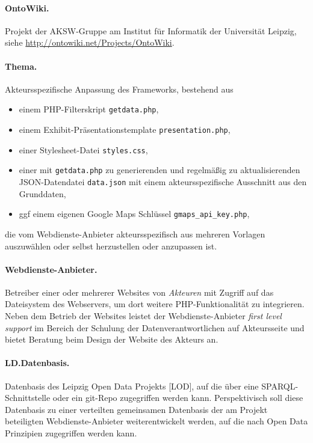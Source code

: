 \documentclass[11pt,a4paper]{article}
\begin{document}
\paragraph{OntoWiki.} 
Projekt der AKSW-Gruppe am Institut für Informatik der Universität Leipzig,
siehe \url{http://ontowiki.net/Projects/OntoWiki}.

\paragraph{Thema.} 
Akteursspezifische Anpassung des Frameworks, bestehend aus 
\begin{itemize}
\item einem PHP-Filterskript \texttt{getdata.php},
\item einem Exhibit-Präsentationstemplate \texttt{presentation.php},
\item einer Stylesheet-Datei \texttt{styles.css},
\item einer mit \texttt{getdata.php} zu generierenden und regelmäßig zu
  aktualisierenden JSON-Datendatei \texttt{data.json} mit einem
  akteursspezifische Ausschnitt aus den Grunddaten,
\item ggf einem eigenen Google Maps Schlüssel \texttt{gmaps\_api\_key.php},
\end{itemize}
die vom Webdienste-Anbieter akteursspezifisch aus mehreren Vorlagen
auszuwählen oder selbst herzustellen oder anzupassen ist.

\paragraph{Webdienste-Anbieter.} 
Betreiber einer oder mehrerer Websites von \emph{Akteuren} mit Zugriff auf das
Dateisystem des Webservers, um dort weitere PHP-Funktionalität zu integrieren.
Neben dem Betrieb der Websites leistet der Webdienste-Anbieter \emph{first
  level support} im Bereich der Schulung der Datenverantwortlichen auf
Akteursseite und bietet Beratung beim Design der Website des Akteurs an.

\paragraph{LD.Datenbasis.} 
Datenbasis des Leipzig Open Data Projekts [LOD], auf die über eine
SPARQL-Schnittstelle oder ein git-Repo zugegriffen werden kann.
Perspektivisch soll diese Datenbasis zu einer verteilten gemeinsamen
Datenbasis der am Projekt beteiligten Webdienste-Anbieter weiterentwickelt
werden, auf die nach Open Data Prinzipien zugegriffen werden kann.
\end{document}
